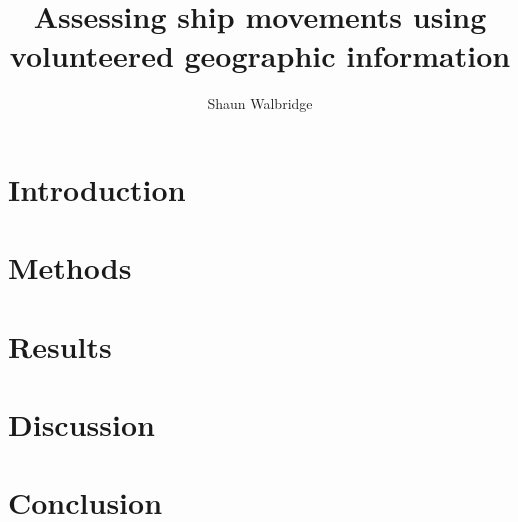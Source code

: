 \documentclass[12pt,letterpaper]{article}
\begin{document}
\title{\Huge{Assessing ship movements using volunteered geographic information}}
\author{Shaun Walbridge}
\maketitle{}

\section{\textbf{Introduction}}
\section{\textbf{Methods}}
\section{\textbf{Results}}
\section{\textbf{Discussion}}
\section{\textbf{Conclusion}}


%

\end{document}
